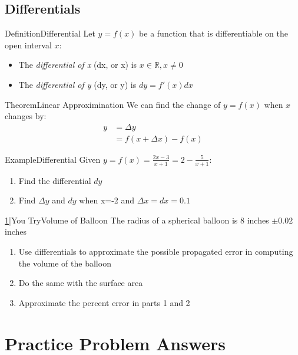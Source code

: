 \documentclass{MathNotes}
\newenvironment{example}[1]{\begin{BlueBox}{Example}{#1}}{\end{BlueBox}}
\newenvironment{definition}[1]{\begin{RedBox}{Definition}{#1}}{\end{RedBox}}
\newenvironment{theorem}[1]{\begin{GrayBox}{Theorem}{#1}}{\end{GrayBox}}
\newenvironment{practice}[2]{\begin{PurpleBox}{\texorpdfstring{#1}\Big|You Try}{#2}}{\end{PurpleBox}}
\begin{document}
\subsection{Differentials}
\begin{definition}{Differential}
	Let $y=f(x)$ be a function that is differentiable on the open interval $x$:
	\begin{itemize}
		\item The \textit{differential of x} (dx, or \Delta x) is $x\in\mathbb{R}, x\neq 0$
		\item The \textit{differential of y} (dy, or \Delta y) is $dy=f'(x)dx$
	\end{itemize}
\end{definition}
\begin{theorem}{Linear Approximination}
	We can find the change of $y=f(x)$ when $x$ changes by:
	\begin{align*}
		y & =\Delta y           \\
		  & =f(x+\Delta x)-f(x)
	\end{align*}
\end{theorem}
\begin{example}{Differential}
	Given $\displaystyle y=f(x)=\frac{2x-3}{x+1}=2-\frac{5}{x+1}$:
	\begin{enumerate}
		\item Find the differential $dy$
		\item Find $\Delta y$ and $dy$ when x=-2 and $\Delta x=dx=0.1$
	\end{enumerate}

\end{example}
\begin{practice}{\hyperref[ans:3.6-1]{1}}{Volume of Balloon}
	The radius of a spherical balloon is 8 inches $\pm 0.02$ inches
	\begin{enumerate}
		\item Use differentials to approximate the possible propagated error in computing the volume of the balloon
		\item Do the same with the surface area
		\item Approximate the percent error in parts 1 and 2
	\end{enumerate}
\end{practice}


\newpage
\section{Practice Problem Answers}
\end{document}
